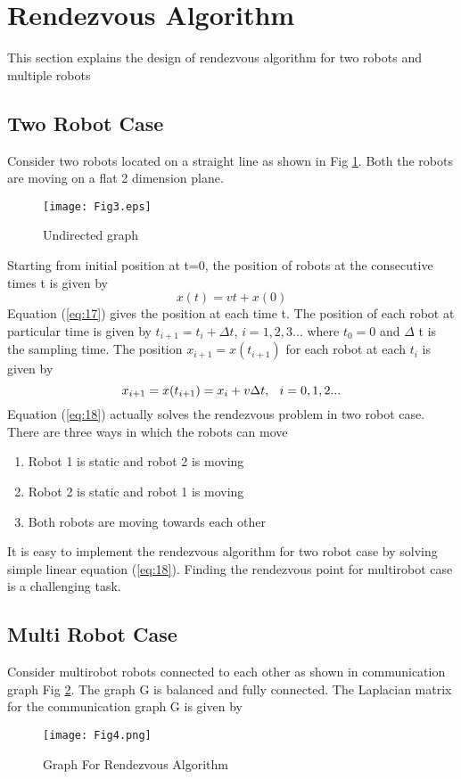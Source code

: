 \documentclass[twocolumn]{IETEJR}
\begin{document}
\section{Rendezvous Algorithm}
This section explains the design of rendezvous algorithm for two robots and multiple robots 
\subsection{Two Robot Case}
Consider two robots located on a straight line as shown in Fig \ref{two:robot}. Both the robots are moving on a flat 2 dimension plane. 
\begin{center}
	\begin{figure}[h]
		\texttt{[image: Fig3.eps]}
		\caption{Undirected graph}
		\label{two:robot}
	\end{figure}
\end{center}

Starting from initial position at t=0, the position of robots at the consecutive times t is given by 
\begin{equation}
x(t)=vt+x(0) \label{eq:17}
\end{equation}
Equation (\ref{eq:17}) gives the position at each time t. The position of each robot at particular time is given by $t_{i+1}=t_{i}+\Delta t$, $i=1,2,3...$ where $t_{0}=0$ and $\Delta$ t is the sampling time. The position $x_{i+1}=x(t_{i+1})$ for each robot at each $t_{i}$ is given by 
\begin{equation}
x_{i+1}=x(t_{i+1})=x_{i}+v\Delta t, \hspace{0.1in} i=0,1,2...
\label{eq:18}
\end{equation} 
Equation (\ref{eq:18}) actually solves the rendezvous problem in two robot case. There are three ways in which the robots can move 
\begin{enumerate}
	\item Robot 1 is static and robot 2 is moving
	\item Robot 2 is static and robot 1 is moving
	\item Both robots are moving towards each other 
\end{enumerate}
It is easy to implement the rendezvous algorithm for two robot case by solving simple linear equation (\ref{eq:18}). Finding the rendezvous point for multirobot case is a challenging task.
\subsection{Multi Robot Case}
Consider multirobot robots connected to each other as shown in communication graph Fig \ref{multi:robot}. The graph G is balanced and fully connected. The Laplacian matrix  for the communication graph G is given by   
\begin{figure}[h]
	\texttt{[image: Fig4.png]}
	\caption{Graph For Rendezvous Algorithm}
	\label{multi:robot}
\end{figure}
\end{document}
